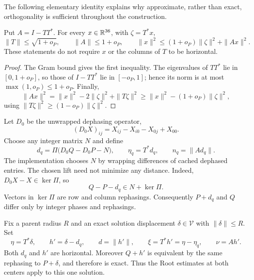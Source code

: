 The following elementary identity explains why approximate, rather
than exact, orthogonality is sufficient throughout the construction.

\begin{lemma}\label{refine:approximate-projection}
Put $A=I-TT^*$.  For every $x\in\mathbb R^{36}$, with $\zeta=T^*x$,
\begin{equation}\label{refine:projection-estimates}
 \|T\|\leq\sqrt{1+o_P},\qquad
 \|A\|\leq1+o_P,\qquad
 \|x\|^2\leq(1+o_P)\|\zeta\|^2+\|Ax\|^2.
\end{equation}
These statements do not require $x$ or the columns of $T$ to be
horizontal.
\end{lemma}

\begin{proof}
The Gram bound gives the first inequality.  The eigenvalues of $TT^*$
lie in $[0,1+o_P]$, so those of $I-TT^*$ lie in $[-o_P,1]$; hence its
norm is at most $\max(1,o_P)\leq1+o_P$.  Finally,
\[
 \|Ax\|^2
 =\|x\|^2-2\|\zeta\|^2+\|T\zeta\|^2
 \geq\|x\|^2-(1+o_P)\|\zeta\|^2,
\]
using $\|T\zeta\|^2\geq(1-o_P)\|\zeta\|^2$.
\end{proof}

Let $D_0$ be the unwrapped dephasing operator,
\[
 (D_0X)_{ij}=X_{ij}-X_{i0}-X_{0j}+X_{00}.
\]
Choose any integer matrix $N$ and define
\begin{equation}\label{refine:alignment}
 d_q=\Pi\bigl(D_0Q-D_0P-N\bigr),\qquad
 \eta_q=T^*d_q,\qquad n_q=\|A d_q\|.
\end{equation}
The implementation chooses $N$ by wrapping differences of cached
dephased entries.  The chosen lift need not minimize any distance.
Indeed, $D_0X-X\in\ker\Pi$, so
\[
 Q-P-d_q\in N+\ker\Pi.
\]
Vectors in $\ker\Pi$ are row and column rephasings.  Consequently
$P+d_q$ and $Q$ differ only by integer phases and rephasings.

Fix a parent radius $R$ and an exact solution displacement
$\delta\in\mathcal V$ with $\|\delta\|\leq R$.  Set
\begin{equation}\label{refine:relative-displacement}
 \eta=T^*\delta,\qquad
 h'=\delta-d_q,\qquad d=\|h'\|,\qquad
 \xi=T^*h'=\eta-\eta_q,\qquad \nu=Ah'.
\end{equation}
Both $d_q$ and $h'$ are horizontal.  Moreover $Q+h'$ is equivalent by
the same rephasing to $P+\delta$, and therefore is exact.  Thus the
Root estimates at both centers apply to this one solution.

